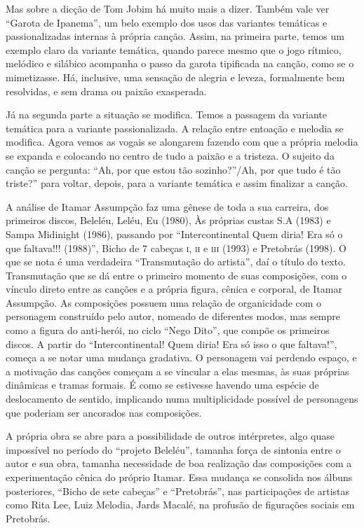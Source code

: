 Mas sobre a dicção de Tom Jobim há muito mais a dizer. Também vale ver
``Garota de Ipanema'', um belo exemplo dos usos das variantes temáticas e
passionalizadas internas à própria canção. Assim, na primeira parte,
temos um exemplo claro da variante temática, quando parece mesmo que o
jogo rítmico, melódico e silábico acompanha o passo da garota tipificada
na canção, como se o mimetizasse. Há, inclusive, uma sensação de alegria
e leveza, formalmente bem resolvidas, e sem drama ou paixão exasperada.

Já na segunda parte a situação se modifica. Temos a passagem da variante
temática para a variante passionalizada. A relação entre entoação e
melodia se modifica. Agora vemos as vogais se alongarem fazendo com que
a própria melodia se expanda e colocando no centro de tudo a paixão e a
tristeza. O sujeito da canção se pergunta: ``Ah, por que estou tão
sozinho?''/Ah, por que tudo é tão triste?'' para voltar, depois, para a
variante temática e assim finalizar a canção.

A análise de Itamar Assumpção faz uma gênese de toda a sua carreira, dos
primeiros discos, Beleléu, Leléu, Eu (1980), Às próprias custas S.A
(1983) e Sampa Midinight (1986), passando por ``Intercontinental Quem
diria! Era só o que faltava!!! (1988)'', Bicho de 7 cabeças \textsc{i}, \textsc{ii} e \textsc{iii}
(1993) e Pretobrás (1998). O que se nota é uma verdadeira ``Transmutação
do artista'', daí o título do texto. Transmutação que se dá entre o
primeiro momento de suas composições, com o vínculo direto entre as
canções e a própria figura, cênica e corporal, de Itamar Assumpção. As
composições possuem uma relação de organicidade com o personagem
construído pelo autor, nomeado de diferentes modos, mas sempre como a
figura do anti-herói, no ciclo ``Nego Dito'', que compõe os primeiros
discos. A partir do ``Intercontinental! Quem diria! Era só isso o que
faltava!'', começa a se notar uma mudança gradativa. O personagem vai
perdendo espaço, e a motivação das canções começam a se vincular a elas
mesmas, às suas próprias dinâmicas e tramas formais. É como se estivesse
havendo uma espécie de deslocamento de sentido, implicando numa
multiplicidade possível de personagens que poderiam ser ancorados nas
composições.

A própria obra se abre para a possibilidade de outros intérpretes, algo
quase impossível no período do ``projeto Beleléu'', tamanha força de
sintonia entre o autor e sua obra, tamanha necessidade de boa realização
das composições com a experimentação cênica do próprio Itamar. Essa
mudança se consolida nos álbuns posteriores, ``Bicho de sete cabeças'' e
``Pretobrás'', nas participações de artistas como Rita Lee, Luiz
Melodia, Jards Macalé, na profusão de figurações sociais em Pretobrás.

